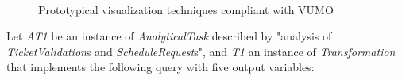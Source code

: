 \documentclass[]{interact}
\theoremstyle{plain}%
\theoremstyle{definition}
\theoremstyle{remark}
\theoremstyle{definition}
\begin{document}
\begin{figure}
\centering
{}
\\
\caption{Prototypical visualization techniques compliant with VUMO}
\label{fig:visualizations}
\end{figure}


Let \textit{AT1} be an instance of \textit{AnalyticalTask} described by "analysis of \textit{TicketValidation}s and \textit{ScheduleRequest}s", and \textit{T1} an instance of \textit{Transformation} that implements the following query with five output variables:
\end{document}
